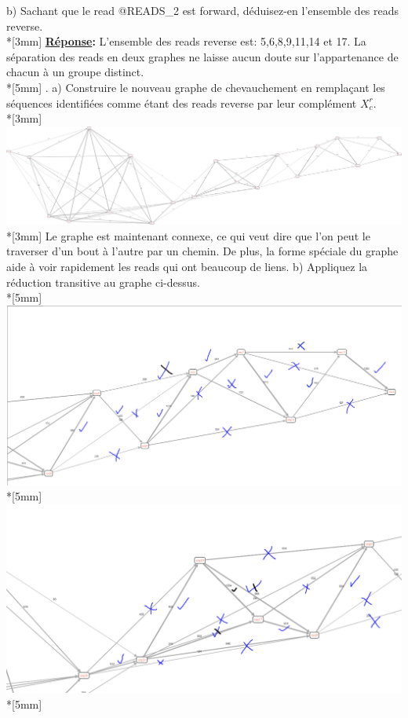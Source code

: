 \documentclass[11pt, letterpaper]{article}
\begin{document}
{b) Sachant que le read @READS\_2 est forward, déduisez-en l'ensemble des reads reverse. \\*[3mm]
\textbf{\underline{Réponse}:} L'ensemble des reads reverse est: 5,6,8,9,11,14 et 17. La séparation des reads en deux graphes ne laisse aucun doute sur l'appartenance de chacun à un groupe distinct.\\*[5mm]
. a) Construire le nouveau graphe de chevauchement en remplaçant les séquences identifiées comme étant des reads reverse par leur complément $X^r_c$. \\*[3mm]
\includegraphics[width=\textwidth]{Images/Assemblage_no3_a).png} \\*[3mm]
Le graphe est maintenant connexe, ce qui veut dire que l'on peut le traverser d'un bout à l'autre par un chemin. De plus, la forme spéciale du graphe aide à voir rapidement les reads qui ont beaucoup de liens.
b) Appliquez la réduction transitive au graphe ci-dessus. \\*[5mm]
\includegraphics[width=\textwidth]{Images/Reduction_trans_1.png} \\*[5mm]
\includegraphics[width=\textwidth]{Images/Reduction_trans_2.png} \\*[5mm]
}
\end{document}
